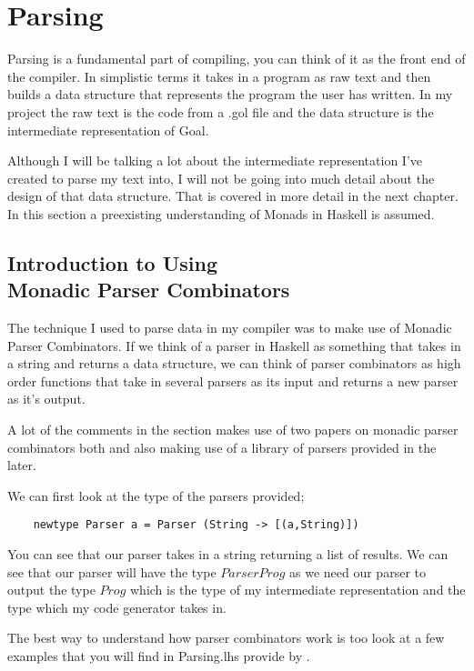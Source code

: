 
\chapter{Parsing}

Parsing is a fundamental part of compiling, you can think of it as the front end of the compiler. In simplistic terms it takes in a program as raw text and then builds a data structure that represents the program the user has written. In my project the raw text is the code from a .gol file and the data structure is the intermediate representation of Goal. 

Although I will be talking a lot about the intermediate representation I've created to parse my text into, I will not be going into much detail about the design of that data structure. That is covered in more detail in the next chapter. In this section a preexisting understanding of Monads in Haskell is assumed.      

\section[Introduction to Using Monadic Parser Combinators]{Introduction to Using \\ Monadic Parser Combinators}

The technique I used to parse data in my compiler was to make use of Monadic Parser Combinators. If we think of a parser in Haskell as something that takes in a string and returns a data structure, we can think of parser combinators as high order functions that take in several parsers as its input and returns a new parser as it's output. 

A lot of the comments in the section makes use of two papers on monadic parser combinators both \cite{Hutton96} and \cite{Hutton98} also making use of a library of parsers provided in the later. 

We can first look at the type of the parsers provided;

\begin{lstlisting}
	newtype Parser a = Parser (String -> [(a,String)])
\end{lstlisting}  

You can see that our parser takes in a string returning a list of results. We can see that our parser will have the type $Parser Prog$ as we need our parser to output the type $Prog$ which is the type of my intermediate representation and the type which my code generator takes in. 

The best way to understand how parser combinators work is too look at a few examples that you will find in Parsing.lhs provide by \cite{Hutton98}.

